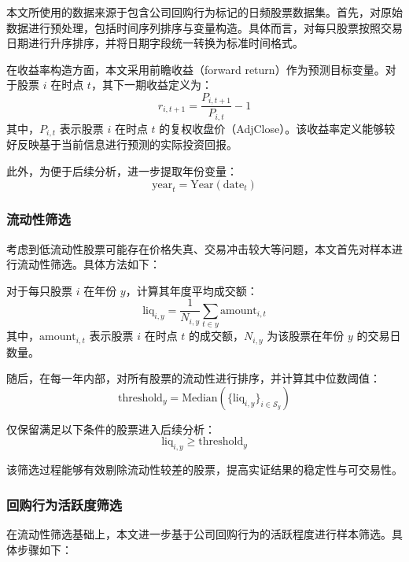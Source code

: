 \documentclass[a4paper,10pt]{article}
\begin{document}
本文所使用的数据来源于包含公司回购行为标记的日频股票数据集。首先，对原始数据进行预处理，包括时间序列排序与变量构造。具体而言，对每只股票按照交易日期进行升序排序，并将日期字段统一转换为标准时间格式。

在收益率构造方面，本文采用前瞻收益（forward return）作为预测目标变量。对于股票 $i$ 在时点 $t$，其下一期收益定义为：
\begin{equation}
r_{i,t+1} = \frac{P_{i,t+1}}{P_{i,t}} - 1
\end{equation}
其中，$P_{i,t}$ 表示股票 $i$ 在时点 $t$ 的复权收盘价（AdjClose）。该收益率定义能够较好反映基于当前信息进行预测的实际投资回报。

此外，为便于后续分析，进一步提取年份变量：
\begin{equation}
\text{year}_t = \text{Year}(\text{date}_t)
\end{equation}

\subsubsection{流动性筛选}

考虑到低流动性股票可能存在价格失真、交易冲击较大等问题，本文首先对样本进行流动性筛选。具体方法如下：

对于每只股票 $i$ 在年份 $y$，计算其年度平均成交额：
\begin{equation}
\text{liq}_{i,y} = \frac{1}{N_{i,y}} \sum_{t \in y} \text{amount}_{i,t}
\end{equation}
其中，$\text{amount}_{i,t}$ 表示股票 $i$ 在时点 $t$ 的成交额，$N_{i,y}$ 为该股票在年份 $y$ 的交易日数量。

随后，在每一年内部，对所有股票的流动性进行排序，并计算其中位数阈值：
\begin{equation}
\text{threshold}_y = \text{Median} \left( \{ \text{liq}_{i,y} \}_{i \in \mathcal{S}_y} \right)
\end{equation}

仅保留满足以下条件的股票进入后续分析：
\begin{equation}
\text{liq}_{i,y} \geq \text{threshold}_y
\end{equation}

该筛选过程能够有效剔除流动性较差的股票，提高实证结果的稳定性与可交易性。

\subsubsection{回购行为活跃度筛选}

在流动性筛选基础上，本文进一步基于公司回购行为的活跃程度进行样本筛选。具体步骤如下：
\end{document}
